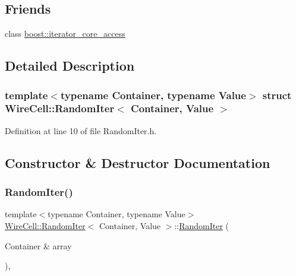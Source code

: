 \subsection*{Friends}
\begin{DoxyCompactItemize}
\item 
class \hyperlink{struct_wire_cell_1_1_random_iter_ac09f73e325921cc50ebcd96bed0f8096}{boost\+::iterator\+\_\+core\+\_\+access}
\end{DoxyCompactItemize}


\subsection{Detailed Description}
\subsubsection*{template$<$typename Container, typename Value$>$\newline
struct Wire\+Cell\+::\+Random\+Iter$<$ Container, Value $>$}



Definition at line 10 of file Random\+Iter.\+h.



\subsection{Constructor \& Destructor Documentation}
\mbox{\label{struct_wire_cell_1_1_random_iter_add59ce09e0022afcb5b2eaaab175b2ff}} 
\subsubsection{\texorpdfstring{Random\+Iter()}{RandomIter()}\hspace{0.1cm}{\footnotesize\ttfamily [1/2]}}
{\footnotesize\ttfamily template$<$typename Container, typename Value$>$ \\
\hyperlink{struct_wire_cell_1_1_random_iter}{Wire\+Cell\+::\+Random\+Iter}$<$ Container, Value $>$\+::\hyperlink{struct_wire_cell_1_1_random_iter}{Random\+Iter} (\begin{DoxyParamCaption}\item[{Container \&}]{array }\end{DoxyParamCaption})\hspace{0.3cm}{\ttfamily [inline]}, {\ttfamily [explicit]}}



